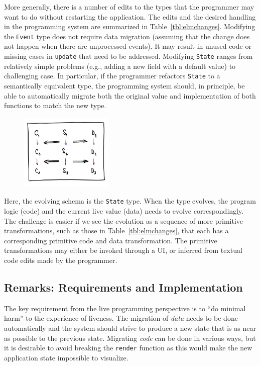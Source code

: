 \documentclass[english,crc]{programming}
\DeclareRobustCommand{\frameworkbox}[1]{\leftbar#1\endleftbar}
\newcommand{\frameworkboxtitle}[1]{\noindent{\firamedium #1.}\quad}
\begin{document}
More generally, there is a number of edits to the types that the programmer may want to do
without restarting the application. The edits and the desired handling in the programming
system are summarized in Table~\ref{tbl:elmchanges}. Modifying the \texttt{Event} type does not
require data migration (assuming that the change does not happen when there are unprocessed
events). It may result in unused code or missing cases in \texttt{update} that need to be addressed.
Modifying \texttt{State} ranges from relatively simple problems (e.g., adding a new field with a
default value) to challenging case. In particular, if the programmer refactors \texttt{State} to a
semantically equivalent type, the programming system should, in principle, be able to automatically
migrate both the original value and implementation of both functions to match the new type.

\frameworkbox{
\begin{figure}
\vspace{0em}
\includegraphics[width=12em]{figures/arr-steps.png}
\vspace{0em}
\end{figure}
\frameworkboxtitle{Primitive Schema Transformations}
Here, the evolving schema is the \texttt{State} type. When the type evolves,
the program logic (code) and the current live value (data) needs to evolve
correspondingly. The challenge is easier if we see the evolution as a sequence of more primitive
transformations, such as those in Table~\ref{tbl:elmchanges}, that each has a corresponding
primitive code and data transformation. The primitive transformations may either be invoked
through a UI, or inferred from textual code edits made by the programmer.
}

\subsection*{Remarks: Requirements and Implementation}
The key requirement from the live programming perspective is to ``do minimal harm'' to the experience of liveness.
The migration of \emph{data} needs to be done automatically and the system should strive
to produce a new state that is as near as possible to the previous state. Migrating
\emph{code} can be done in various ways,
but it is desirable to avoid breaking the \texttt{render} function as this would make the
new application state impossible to visualize.
\end{document}
